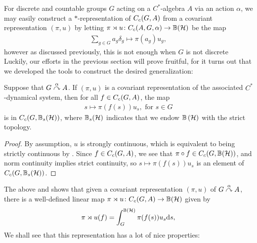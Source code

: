 For discrete and countable groups $G$ acting on a $C^*$-algebra $A$ via an action $\alpha$, we may easily construct a $*$-representation of $C_c(G,A)$ from a covariant representation $(\pi,u)$ by letting $\pi \rtimes u \colon C_c(A,G,\alpha) \to \mathbb{B}(\mathcal{H})$ be the map
\begin{align*}
\sum_{g \in G} a_g \delta_g \mapsto \pi(a_g) u_g,
\end{align*}
however as discussed previously, this is not enough when $G$ is not discrete Luckily, our efforts in the previous section will prove fruitful, for it turns out that we developed the tools to construct the desired generalization:
\begin{lemma}
Suppose that $G \stackrel{\alpha}{\curvearrowright} A$. If $(\pi,u)$ is a covariant representation of the associated $C^*$-dynamical system, then for all $f \in C_c(G,A)$, the map
\begin{align*}
	s \mapsto \pi(f(s)) u_s, \text{ for }s \in G
\end{align*}
is in $C_c(G,\mathbb{B}_s(\mathcal{H}))$, where $\mathbb{B}_s(\mathcal{H})$ indicates that we endow $\mathbb{B}\left(\mathcal{H} \right)$ with the strict topology.
\label{cross:integrandcont}
\end{lemma}
\begin{proof}
By assumption, $u$ is strongly continuous, which is equivalent to being strictly continuous by . Since $f \in C_c(G,A)$, we see that $\pi \circ f \in C_c(G,\mathbb{B}(\mathcal{H}))$, and norm continuity implies strict continuity, so $s \mapsto \pi(f(s)) u_s$ is an element of $C_c(G,\mathbb{B}_s(\mathcal{H}))$.
\end{proof}
The above and  shows that given a covariant representation $(\pi,u)$ of $G \stackrel{\alpha}{\curvearrowright} A$, there is a well-defined linear map $\pi \rtimes u \colon C_c(G,A) \to \mathbb{B}(\mathcal{H})$ given by
\begin{align*}
\pi \rtimes u (f) = \int_G^{\mathbb{B}(\mathcal{H})} \pi(f(s)) u_s \mathrm{d} s,
\end{align*}
We shall see that this representation has a lot of nice properties:

